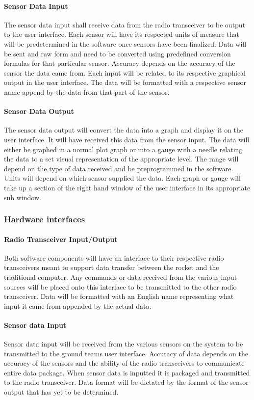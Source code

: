 \documentclass[10pt,draftclsnofoot,onecolumn,compsoc]{IEEEtran}
\begin{document}
\paragraph{\bf Sensor Data Input}
The sensor data input shall receive data from the radio transceiver to be output to the user interface. Each sensor will have its respected units of measure that will be predetermined in the software once sensors have been finalized. Data will be sent and raw form and need to be converted using predefined conversion formulas for that particular sensor. Accuracy depends on the accuracy of the sensor the data came from. Each input will be related to its respective graphical output in the user interface. The data will be formatted with a respective sensor name append by the data from that part of the sensor.
\paragraph{\bf Sensor Data Output}
The sensor data output will convert the data into a graph and display it on the user interface. It will have received this data from the sensor input. The data will either be graphed in a normal plot graph or into a gauge with a needle relating the data to a set visual representation of the appropriate level. The range will depend on the type of data received and be preprogrammed in the software. Units will depend on which sensor supplied the data. Each graph or gauge will take up a section of the right hand window of the user interface in its appropriate sub window. 


\subsubsection{Hardware interfaces }
\paragraph{\bf Radio Transceiver Input/Output}
		Both software components will have an interface to their respective radio transceivers meant to support data transfer between the rocket and the traditional computer. Any commands or data received from the various input sources will be placed onto this interface to be transmitted to the other radio transceiver. Data will be formatted with an English name representing what input it came from appended by the actual data.
\paragraph{\bf Sensor data Input}
Sensor data input will be received from the various sensors on the system to be transmitted to the ground teams user interface. Accuracy of data depends on the accuracy of the sensors and the ability of the radio transceivers to communicate entire data package. When sensor data is inputted it is packaged and transmitted to the radio transceiver. Data format will be dictated by the format of the sensor output that has yet to be determined.
\end{document}
